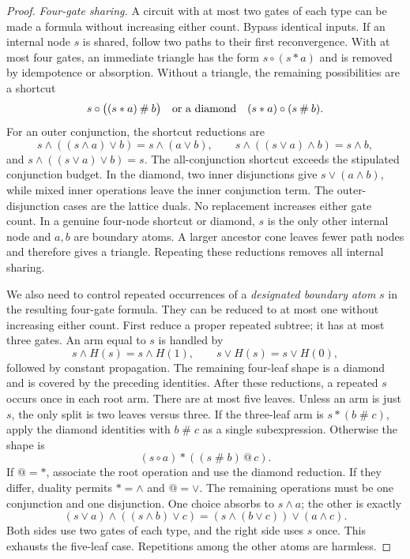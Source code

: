 \documentclass[11pt]{article}
\theoremstyle{definition}
\theoremstyle{remark}
\begin{document}
\begin{proof}
\emph{Four-gate sharing.} A circuit with at most two gates of each type can be made a formula without increasing either count. Bypass identical inputs. If an internal node $s$ is shared, follow two paths to their first reconvergence. With at most four gates, an immediate triangle has the form $s\mathbin{\circ}(s\mathbin{*}a)$ and is removed by idempotence or absorption. Without a triangle, the remaining possibilities are a shortcut
\[
s\mathbin{\circ}\bigl((s\mathbin{*}a)\mathbin{\#}b\bigr)
\quad\hbox{or a diamond}\quad
(s\mathbin{*}a)\mathbin{\circ}(s\mathbin{\#}b).
\]
For an outer conjunction, the shortcut reductions are
\[
s\wedge((s\wedge a)\vee b)=s\wedge(a\vee b),\qquad
s\wedge((s\vee a)\wedge b)=s\wedge b,
\]
and $s\wedge((s\vee a)\vee b)=s$. The all-conjunction shortcut exceeds the stipulated conjunction budget. In the diamond, two inner disjunctions give $s\vee(a\wedge b)$, while mixed inner operations leave the inner conjunction term. The outer-disjunction cases are the lattice duals. No replacement increases either gate count. In a genuine four-node shortcut or diamond, $s$ is the only other internal node and $a,b$ are boundary atoms. A larger ancestor cone leaves fewer path nodes and therefore gives a triangle. Repeating these reductions removes all internal sharing.

We also need to control repeated occurrences of a \emph{designated boundary atom} $s$ in the resulting four-gate formula. They can be reduced to at most one without increasing either count. First reduce a proper repeated subtree; it has at most three gates. An arm equal to $s$ is handled by
\[
s\wedge H(s)=s\wedge H(1),\qquad
s\vee H(s)=s\vee H(0),
\]
followed by constant propagation. The remaining four-leaf shape is a diamond and is covered by the preceding identities. After these reductions, a repeated $s$ occurs once in each root arm. There are at most five leaves. Unless an arm is just $s$, the only split is two leaves versus three. If the three-leaf arm is $s\mathbin{*}(b\mathbin{\#}c)$, apply the diamond identities with $b\mathbin{\#}c$ as a single subexpression. Otherwise the shape is
\[
(s\mathbin{\circ}a)\mathbin{*}
       ((s\mathbin{\#}b)\mathbin{@}c).
\]
If $@=*$, associate the root operation and use the diamond reduction. If they differ, duality permits $*=\wedge$ and $@=\vee$. The remaining operations must be one conjunction and one disjunction. One choice absorbs to $s\wedge a$; the other is exactly
\[
(s\vee a)\wedge((s\wedge b)\vee c)
   =(s\wedge(b\vee c))\vee(a\wedge c).
\]
Both sides use two gates of each type, and the right side uses $s$ once. This exhausts the five-leaf case. Repetitions among the other atoms are harmless.


\end{proof}
\end{document}
